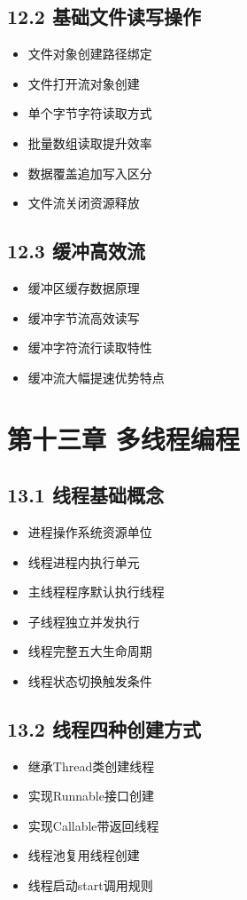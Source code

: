 \subsection{12.2 基础文件读写操作}
\begin{itemize}
\item 文件对象创建路径绑定
\item 文件打开流对象创建
\item 单个字节字符读取方式
\item 批量数组读取提升效率
\item 数据覆盖追加写入区分
\item 文件流关闭资源释放
\end{itemize}

\subsection{12.3 缓冲高效流}
\begin{itemize}
\item 缓冲区缓存数据原理
\item 缓冲字节流高效读写
\item 缓冲字符流行读取特性
\item 缓冲流大幅提速优势特点
\end{itemize}

\section{第十三章 多线程编程}
\subsection{13.1 线程基础概念}
\begin{itemize}
\item 进程操作系统资源单位
\item 线程进程内执行单元
\item 主线程程序默认执行线程
\item 子线程独立并发执行
\item 线程完整五大生命周期
\item 线程状态切换触发条件
\end{itemize}

\subsection{13.2 线程四种创建方式}
\begin{itemize}
\item 继承Thread类创建线程
\item 实现Runnable接口创建
\item 实现Callable带返回线程
\item 线程池复用线程创建
\item 线程启动start调用规则
\end{itemize}

